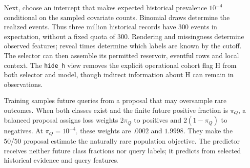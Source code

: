 \documentclass[11pt]{article}
\begin{document}
Next, choose an intercept that makes expected historical prevalence $10^{-4}$ conditional on the sampled covariate counts. Binomial draws determine the realized events. Thus three million historical records have 300 events in expectation, without a fixed quota of 300. Rendering and missingness determine observed features; reveal times determine which labels are known by the cutoff. The selector can then assemble its permitted reservoir, eventful rows and local context. The \texttt{hide\_h} view removes the explicit operational cohort flag H from both selector and model, though indirect information about H can remain in observations.

Training samples future queries from a proposal that may oversample rare outcomes. When both classes exist and the finite future positive fraction is $\pi_Q$, a balanced proposal assigns loss weights $2\pi_Q$ to positives and $2(1-\pi_Q)$ to negatives. At $\pi_Q=10^{-4}$, these weights are $.0002$ and $1.9998$. They make the 50/50 proposal estimate the naturally rare population objective. The predictor receives neither future class fractions nor query labels; it predicts from selected historical evidence and query features.
\end{document}

